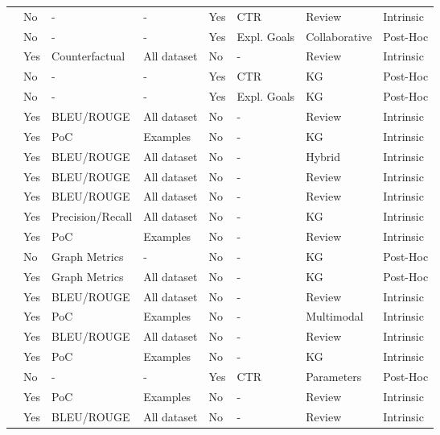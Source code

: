 \begin{xltabular}{\textwidth}{l|l|l|l|l|l|l|l}
\cite{rana_daddio_manzato_bridge_2022} & No & - & - & Yes & CTR & Review & Intrinsic \\
\cite{haque_islam_mikalef_2025} & No & - & - & Yes & Expl. Goals & Collaborative & Post-Hoc \\
\cite{ranjbar_momtazi_homayoonpour_2024} & Yes & Counterfactual & All dataset & No & - & Review & Intrinsic \\
\cite{caro-martinez_jorro-aragoneses_diaz-agudo_recio-garcia_2024} & No & - & - & Yes & CTR & KG & Post-Hoc \\
\cite{de_campos_fernandez_luna_huete_2024} & No & - & - & Yes & Expl. Goals & KG & Post-Hoc \\
\cite{xie_wang_xu_chen_zheng_tang_2024} & Yes & BLEU/ROUGE & All dataset & No & - & Review & Intrinsic \\
\cite{le_abel_gouspillou_2023} & Yes & PoC & Examples & No & - & KG & Intrinsic \\
\cite{bastola_shakya_2024} & Yes & BLEU/ROUGE & All dataset & No & - & Hybrid & Intrinsic \\
\cite{hu_liu_miao_lin_miao_2022} & Yes & BLEU/ROUGE & All dataset & No & - & Review & Intrinsic \\
\cite{zhan_li_li_liu_gupta_kot_2023} & Yes & BLEU/ROUGE & All dataset & No & - & Review & Intrinsic \\
\cite{LI2025110542} & Yes & Precision/Recall & All dataset & No & - & KG & Intrinsic \\
\cite{XIE2021235} & Yes & PoC & Examples & No & - & Review & Intrinsic \\
\cite{balloccu_boratto_fenu_marras_2022} & No & Graph Metrics & - & No & - & KG & Post-Hoc \\
\cite{balloccu_boratto_fenu_marras_2023} & Yes & Graph Metrics & All dataset & No & - & KG & Post-Hoc \\
\cite{WU2024111133} & Yes & BLEU/ROUGE & All dataset & No & - & Review & Intrinsic \\
\cite{10.1145/2766462.2767755} & Yes & PoC & Examples & No & - & Multimodal & Intrinsic \\
\cite{10.1145/3340531.3411992} & Yes & BLEU/ROUGE & All dataset & No & - & Review & Intrinsic \\
\cite{10.1145/3292500.3330989} & Yes & PoC & Examples & No & - & KG & Intrinsic \\
\cite{10.1145/3351095.3372852} & No & - & - & Yes & CTR & Parameters & Post-Hoc \\
\cite{10.1145/2806416.2806504} & Yes & PoC & Examples & No & - & Review & Intrinsic \\
\cite{10.1145/3485447.3512031} & Yes & BLEU/ROUGE & All dataset & No & - & Review & Intrinsic \\
\bottomrule
\end{xltabular}
